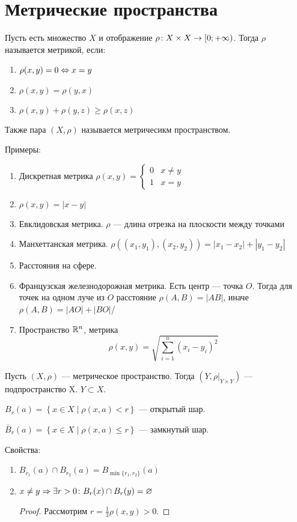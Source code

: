 \section{Метрические пространства}

\begin{Def}
Пусть есть множество $X$ и отображение $\rho \colon X \times X \rightarrow \left[0; +\infty\right) $. Тогда $\rho$ называется метрикой, если:
\begin{enumerate}
\item $\rho(x, y) = 0 \Leftrightarrow x = y$
\item $\rho(x, y) = \rho(y, x)$
\item $\rho(x, y) + \rho(y, z) \geqslant \rho(x, z)$
\end{enumerate} 
Также пара $(X, \rho)$ называется метричесикм пространством.
\end{Def}

Примеры:
\begin{enumerate}
\item Дискретная метрика
$\rho(x, y) = \begin{cases}0 & x \ne y \\ 1 & x = y\end{cases}$
\item $\rho(x, y) = \left|x - y\right|$
\item Евклидовская метрика. $\rho$ --- длина отрезка на плоскости между точками
\item Манхеттанская метрика. $\rho\left((x_1, y_1), (x_2, y_2)\right) = |x_1 - x_2| + |y_1 - y_2|$
\item Расстояния на сфере.
\item Французская железнодорожная метрика. Есть центр --- точка $O$. Тогда для точек на одном луче из $O$ расстояние $\rho(A, B) = |AB|$, иначе $\rho(A, B) = |AO| + |BO|$/
\item Пространство $\mathbb{R}^n$, метрика $$\rho(x, y) = \sqrt{\sum_{i=1}^n \left(x_i-y_i\right)^2}$$
\end{enumerate}

\begin{Def}
Пусть $(X, \rho)$ --- метрическое пространство. Тогда $(Y, \rho|_{Y \times Y})$ --- подпространство X. $Y \subset X$.
\end{Def}


\begin{Def}
$B_r(a) = \left\{x \in X \mid \rho(x, a) < r\right\}$ --- открытый шар.
\end{Def}
\begin{Def}
$\bar B_r(a) = \left\{x \in X \mid \rho(x, a) \leqslant r\right\}$ --- замкнутый шар.
\end{Def}

Свойства:
\begin{enumerate}
\item $B_{r_1}(a) \cap B_{r_2}(a) = B_{\min\{r_1, r_2\}}(a)$
\item $x \ne y \Rightarrow \exists r > 0\colon B_r(x) \cap B_r(y) = \varnothing$
\begin{proof}
Рассмотрим $r = \frac13 \rho(x,y) > 0$.
\end{proof}
\end{enumerate}
         

